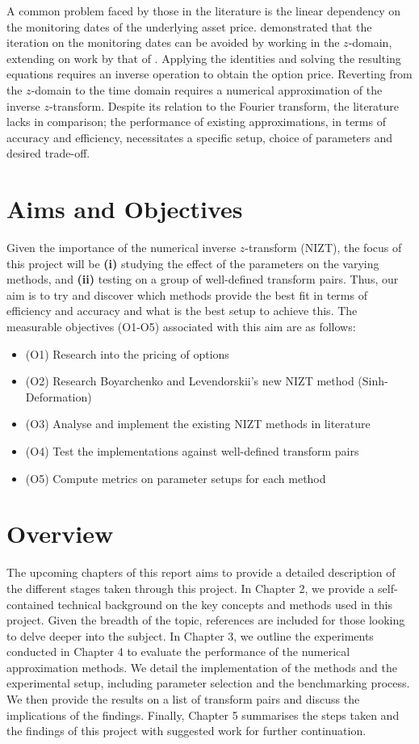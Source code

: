 \documentclass[a4paper]{report}
\begin{document}
A common problem faced by those in the literature is the linear dependency on the monitoring dates of the underlying asset price. \citet{fusai2016spitzer} demonstrated that the iteration on the monitoring dates can be avoided by working in the $z$-domain, extending on work by that of \citet{carr1999option}. Applying the \citet{spitzer1957wiener} identities and solving the resulting equations requires an inverse operation to obtain the option price. Reverting from the $z$-domain to the time domain requires a numerical approximation of the inverse $z$-transform. Despite its relation to the Fourier transform, the literature lacks in comparison; the performance of existing approximations, in terms of accuracy and efficiency, necessitates a specific setup, choice of parameters and desired trade-off.

\section{Aims and Objectives}
Given the importance of the numerical inverse $z$-transform (NIZT), the focus of this project will be \textbf{(i)} studying the effect of the parameters on the varying methods, and \textbf{(ii)} testing on a group of well-defined transform pairs. Thus, our aim is to try and discover which methods provide the best fit in terms of efficiency and accuracy and what is the best setup to achieve this. The measurable objectives (O1-O5) associated with this aim are as follows:

\begin{itemize}
	\item (O1) Research into the pricing of options
	\item (O2) Research Boyarchenko and Levendorskii's new NIZT method (Sinh-Deformation)
	\item (O3) Analyse and implement the existing NIZT methods in literature
	\item (O4) Test the implementations against well-defined transform pairs
	\item (O5) Compute metrics on parameter setups for each method
\end{itemize}

\section{Overview}
The upcoming chapters of this report aims to provide a detailed description of the different stages taken through this project. In Chapter 2, we provide a self-contained technical background on the key concepts and methods used in this project. Given the breadth of the topic, references are included for those looking to delve deeper into the subject. In Chapter 3, we outline the experiments conducted in Chapter 4 to evaluate the performance of the numerical approximation methods. We detail the implementation of the methods and the experimental setup, including parameter selection and the benchmarking process. We then provide the results on a list of transform pairs and discuss the implications of the findings. Finally, Chapter 5 summarises the steps taken and the findings of this project with suggested work for further continuation. 
\end{document}

